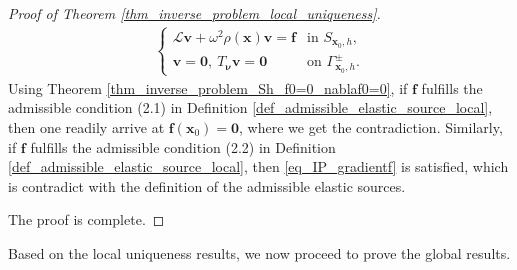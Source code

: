 \documentclass[11pt,reqno,oneside]{amsart}
\theoremstyle{definition}
\theoremstyle{remark}
\numberwithin{equation}{section}
\numberwithin{equation}{section}
\theoremstyle{remark}
\begin{document}
\begin{proof}[Proof of Theorem \ref{thm_inverse_problem_local_uniqueness}]
	\begin{align*} 
		\begin{cases}
			\mathcal{L} \mathbf{v} + \omega^2 \rho\left(\mathbf{x}\right) \mathbf{v} = \mathbf{f} & \text{in } S_{\mathbf{x}_0,h} , \\
			\mathbf{v} = \bm{0}, \ T_{\bm{\nu}} \mathbf{v} = \bm{0} & \text {on } \Gamma_{\mathbf{x}_0,h}^{\pm} .
		\end{cases}
	\end{align*}
	Using Theorem \ref{thm_inverse_problem_Sh_f0=0_nablaf0=0}, if $\mathbf f$ fulfills the admissible condition (2.1) in Definition \ref{def_admissible_elastic_source_local}, then one readily arrive at $ \mathbf{f} \left(\mathbf{x}_0\right) = \bm{0} $, where we get the contradiction. Similarly, if $\mathbf f$ fulfills the admissible condition (2.2) in Definition \ref{def_admissible_elastic_source_local}, then \eqref{eq_IP_gradientf} is satisfied,  which is contradict with the definition of the admissible elastic sources. 
	
	The proof is complete.
\end{proof}

Based on the local uniqueness results, we now proceed to prove the global results. 
\end{document}
